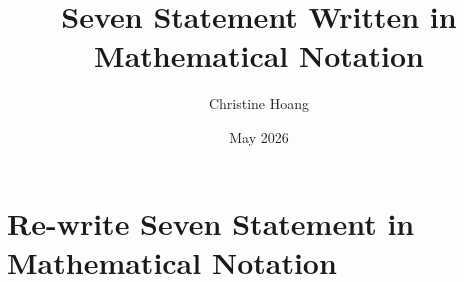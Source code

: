 \documentclass{article}
\title{Seven Statement Written in Mathematical Notation}
\author{Christine Hoang}
\date{May 2026}
\begin{document}
\maketitle

\section{Re-write Seven Statement in Mathematical Notation}
\end{document}
